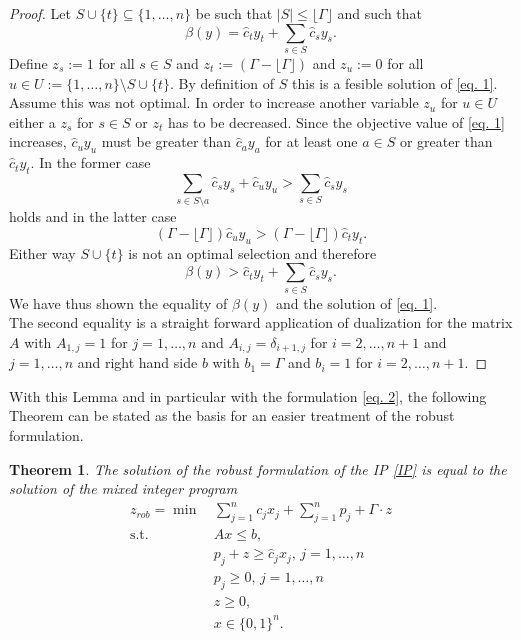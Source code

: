 \documentclass[titlepage, a4paper]{amsbook}
\theoremstyle{plain}
\newtheorem{thm}{Theorem}[chapter]
\theoremstyle{break}
\theoremstyle{definition}
\theoremstyle{remark}
\numberwithin{equation}{thm}
\begin{document}
\begin{proof}
Let $S \cup \{t\} \subseteq \{1,\ldots,n\}$ be such that $\vert S \vert \leq \lfloor \Gamma \rfloor$ and such that
\[\beta(y)=\hat{c}_t y_t + \sum_{s \in S} \hat{c}_s y_s.\]
Define $z_s:=1$ for all $s \in S$ and $z_t:=(\Gamma - \lfloor \Gamma \rfloor)$ and $z_u:=0$ for all $u \in U:=\{1,\ldots,n\} \setminus S\cup\{t\}$. By definition of $S$ this is a fesible solution of \eqref{eq. 1}. Assume this was not optimal. In order to increase another variable $z_u$ for $u \in U$ either a $z_s$ for $s \in S$ or $z_t$ has to be decreased. Since the objective value of \ref{eq. 1} increases, $\hat{c}_u y_u$ must be greater than $\hat{c}_a y_a$ for at least one $a \in S $ or greater than $\hat{c}_t y_t$. In the former case \[\sum_{s \in S \setminus a}\hat{c}_sy_s + \hat{c}_u y_u > \sum_{s \in S }\hat{c}_sy_s\] 
holds and in the latter case
\[(\Gamma - \lfloor \Gamma \rfloor)\hat{c}_u y_u > (\Gamma - \lfloor \Gamma \rfloor)\hat{c}_t y_t.\]
Either way $S \cup \{t\}$ is not an optimal selection and therefore
\[\beta(y)>\hat{c}_t y_t + \sum_{s \in S} \hat{c}_s y_s.\]
We have thus shown the equality of $\beta(y)$ and the solution of \ref{eq. 1}. \\
The second equality is a straight forward application of dualization for the matrix $A$ with $A_{1,j}=1$ for $j=1, \ldots,n$ and $A_{i,j}=\delta_{i+1,j}$ for $i=2,\ldots,n+1$ and $j=1,\ldots,n$ and right hand side $b$ with $b_1=\Gamma$ and $b_i=1$ for $i=2, \ldots, n+1$.
\end{proof}
With this Lemma and in particular with the formulation \eqref{eq. 2}, the following Theorem can be stated as the basis for an easier treatment of the robust formulation.
\begin{thm}
The solution of the robust formulation of the IP \eqref{IP} is equal to the solution of the mixed integer program
\begin{equation}\label{robust}
\begin{split}
    z_{rob}=\min\, &\sum_{j=1}^{n} c_j x_j + \sum_{j=1}^{n}p_j + \Gamma \cdot z\\
    \text{s.t. } &Ax \leq b, \\
    &p_j+ z \geq \hat{c}_jx_j, \, j=1, \ldots,n\\
  &p_j \geq 0, \, j=1, \ldots, n \\
  &z \geq 0, \\
    &x \in \{0,1\}^n.
\end{split}
\end{equation}
\end{thm}
\end{document}
